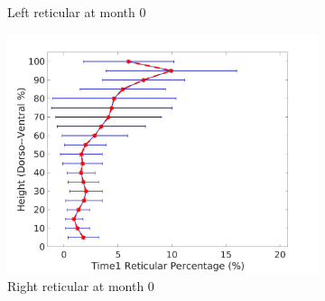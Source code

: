 \begin{figure}[H]
\begin{subfigure}{.42\linewidth}
  \caption{Left reticular at month 0}
  \label{fig:DiseaseDorsoToVentralTime1-c} 
\end{subfigure} 
\begin{subfigure}{.42\linewidth}%
  \includegraphics[width=\linewidth,trim={{.0\wd0} {.0\wd0} {.0\wd0} {.0\wd0}},clip]{QuantitativeAnalysis/Image/RightLungReticularDiseaseDorsoToVentralTime1.jpg}
  \caption{Right reticular at month 0}
  \label{fig:DiseaseDorsoToVentralTime1-d}
\end{subfigure}
\begin{subfigure}{.42\linewidth}%

\end{subfigure}
\end{figure}
